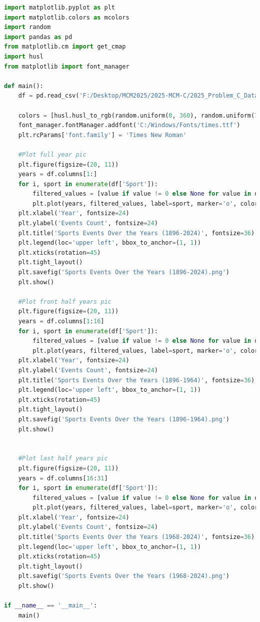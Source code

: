 \documentclass[12pt]{article}
\begin{document}
\begin{lstlisting}[language=Python, style=mystyle, caption=program\_plot.py]
import matplotlib.pyplot as plt
import matplotlib.colors as mcolors
import random
import pandas as pd
from matplotlib.cm import get_cmap
import husl
from matplotlib import font_manager

def main():
    df = pd.read_csv('F:/Desktop/MCM2025/2025-MCM-C/2025_Problem_C_Data/program_plot_end.csv')

    colors = [husl.husl_to_rgb(random.uniform(0, 360), random.uniform(70, 100), random.uniform(50, 80)) for _ in range(len(df['Sport']))]
    font_manager.fontManager.addfont('C:/Windows/Fonts/times.ttf')
    plt.rcParams['font.family'] = 'Times New Roman'

    #Plot full year pic
    plt.figure(figsize=(20, 11))
    years = df.columns[1:]
    for i, sport in enumerate(df['Sport']):
        filtered_values = [value if value != 0 else None for value in df.loc[df['Sport'] == sport, years].values.flatten()]
        plt.plot(years, filtered_values, label=sport, marker='o', color=colors[i])
    plt.xlabel('Year', fontsize=24)
    plt.ylabel('Events Count', fontsize=24)
    plt.title('Sports Events Over the Years (1896-2024)', fontsize=36)
    plt.legend(loc='upper left', bbox_to_anchor=(1, 1))
    plt.xticks(rotation=45)
    plt.tight_layout()
    plt.savefig('Sports Events Over the Years (1896-2024).png')
    plt.show()

    #Plot front half years pic
    plt.figure(figsize=(20, 11))
    years = df.columns[1:16]
    for i, sport in enumerate(df['Sport']):
        filtered_values = [value if value != 0 else None for value in df.loc[df['Sport'] == sport, years].values.flatten()]
        plt.plot(years, filtered_values, label=sport, marker='o', color=colors[i])
    plt.xlabel('Year', fontsize=24)
    plt.ylabel('Events Count', fontsize=24)
    plt.title('Sports Events Over the Years (1896-1964)', fontsize=36)
    plt.legend(loc='upper left', bbox_to_anchor=(1, 1))
    plt.xticks(rotation=45)
    plt.tight_layout()
    plt.savefig('Sports Events Over the Years (1896-1964).png')
    plt.show()


    #Plot last half years pic
    plt.figure(figsize=(20, 11))
    years = df.columns[16:31]
    for i, sport in enumerate(df['Sport']):
        filtered_values = [value if value != 0 else None for value in df.loc[df['Sport'] == sport, years].values.flatten()]
        plt.plot(years, filtered_values, label=sport, marker='o', color=colors[i])
    plt.xlabel('Year', fontsize=24)
    plt.ylabel('Events Count', fontsize=24)
    plt.title('Sports Events Over the Years (1968-2024)', fontsize=36)
    plt.legend(loc='upper left', bbox_to_anchor=(1, 1))
    plt.xticks(rotation=45)
    plt.tight_layout()
    plt.savefig('Sports Events Over the Years (1968-2024).png')
    plt.show()

if __name__ == '__main__':
    main()
\end{lstlisting}
\end{document}
